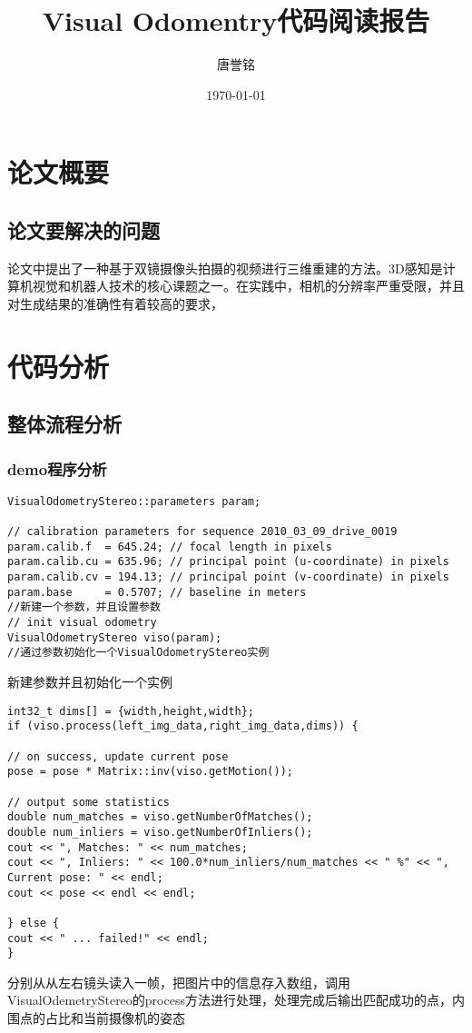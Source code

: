 \documentclass[UTF8]{ctexart}
\title{Visual Odomentry代码阅读报告}
\author{唐誉铭}
\date{\today}
\begin{document}
	\maketitle
	\section{论文概要}
	\subsection{论文要解决的问题}
	论文中提出了一种基于双镜摄像头拍摄的视频进行三维重建的方法。3D感知是计算机视觉和机器人技术的核心课题之一。在实践中，相机的分辨率严重受限，并且对生成结果的准确性有着较高的要求，
	\section{代码分析}
    \subsection{整体流程分析}
    \subsubsection{demo程序分析}
    \begin{verbatim}
VisualOdometryStereo::parameters param;

// calibration parameters for sequence 2010_03_09_drive_0019 
param.calib.f  = 645.24; // focal length in pixels
param.calib.cu = 635.96; // principal point (u-coordinate) in pixels
param.calib.cv = 194.13; // principal point (v-coordinate) in pixels
param.base     = 0.5707; // baseline in meters
//新建一个参数，并且设置参数
// init visual odometry
VisualOdometryStereo viso(param);
//通过参数初始化一个VisualOdometryStereo实例
    \end{verbatim}
    新建参数并且初始化一个实例
    \begin{verbatim}
int32_t dims[] = {width,height,width};
if (viso.process(left_img_data,right_img_data,dims)) {

// on success, update current pose
pose = pose * Matrix::inv(viso.getMotion());

// output some statistics
double num_matches = viso.getNumberOfMatches();
double num_inliers = viso.getNumberOfInliers();
cout << ", Matches: " << num_matches;
cout << ", Inliers: " << 100.0*num_inliers/num_matches << " %" << ", Current pose: " << endl;
cout << pose << endl << endl;

} else {
cout << " ... failed!" << endl;
}
    \end{verbatim}
    分别从从左右镜头读入一帧，把图片中的信息存入数组，调用VisualOdemetryStereo的process方法进行处理，处理完成后输出匹配成功的点，内围点的占比和当前摄像机的姿态
\end{document}
